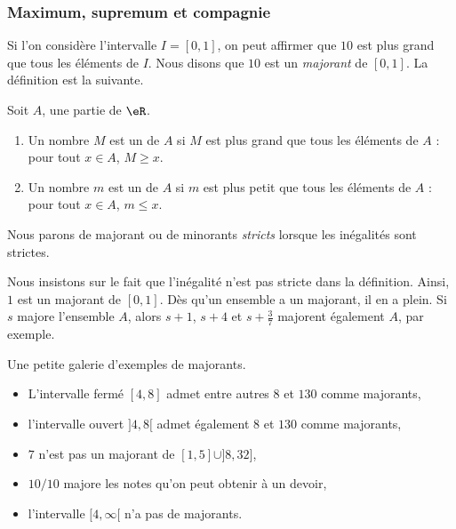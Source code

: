 \subsubsection{Maximum, supremum et compagnie}

  Si l'on considère l'intervalle $I=[0,1]$, on peut affirmer que $10$ est plus grand que tous les éléments de $I$. Nous disons que $10$ est un \emph{majorant} de $[0,1]$. La définition est la suivante.
\begin{definition}
    Soit \( A\), une partie de \( \eR\). 
    \begin{enumerate}
        \item
            Un nombre \( M\) est un  de \( A\) si \( M\) est plus grand que tous les éléments de \( A\) : pour tout \( x\in A\), \( M\geq x\).
        \item
            Un nombre \( m\) est un  de \( A\) si \( m\) est plus petit que tous les éléments de \( A\) : pour tout \( x\in A\), \( m\leq x\).
    \end{enumerate}
    Nous parons de majorant ou de minorants \emph{stricts} lorsque les inégalités sont strictes.
\end{definition}

Nous insistons sur le fait que l'inégalité n'est pas stricte dans la définition. Ainsi, $1$ est un majorant de $[0,1]$. Dès qu'un ensemble a un majorant, il en a plein. Si $s$ majore l'ensemble $A$, alors $s+1$, $s+4$ et \( s+\frac{ 3 }{ 7 }\) majorent également $A$, par exemple.

\begin{example}
Une petite galerie d'exemples de majorants.
\begin{itemize}
\item L'intervalle fermé $[4,8]$ admet entre autres $8$ et $130$ comme majorants,
\item l'intervalle ouvert $]4,8[$ admet également $8$ et $130$ comme majorants,
\item $7$ n'est pas un majorant de $[1,5]\cup]8,32]$,
\item $10/10$ majore les notes qu'on peut obtenir à un devoir,
\item l'intervalle $[4,\infty[$ n'a pas de majorants.
\end{itemize}
\end{example}

